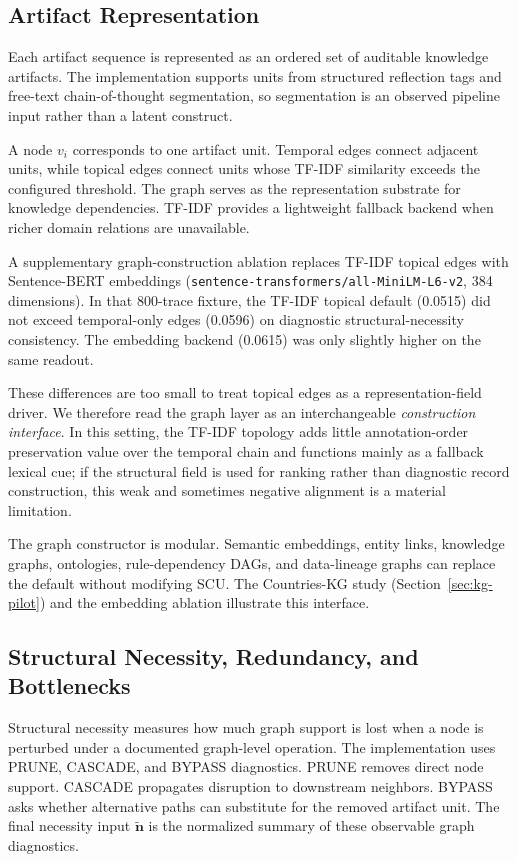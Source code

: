 \documentclass[a4paper,fleqn]{cas-sc}
\begin{document}
\subsection{Artifact Representation}

Each artifact sequence is represented as an ordered set of auditable knowledge artifacts. The implementation supports units from structured reflection tags and free-text chain-of-thought segmentation, so segmentation is an observed pipeline input rather than a latent construct.

A node $v_i$ corresponds to one artifact unit. Temporal edges connect adjacent units, while topical edges connect units whose TF-IDF similarity exceeds the configured threshold. The graph serves as the representation substrate for knowledge dependencies. TF-IDF provides a lightweight fallback backend when richer domain relations are unavailable.

A supplementary graph-construction ablation replaces TF-IDF topical edges with Sentence-BERT embeddings (\texttt{sentence-transformers/all-MiniLM-L6-v2}, 384 dimensions). In that 800-trace fixture, the TF-IDF topical default (0.0515) did not exceed temporal-only edges (0.0596) on diagnostic structural-necessity consistency. The embedding backend (0.0615) was only slightly higher on the same readout.

These differences are too small to treat topical edges as a representation-field driver. We therefore read the graph layer as an interchangeable \emph{construction interface}. In this setting, the TF-IDF topology adds little annotation-order preservation value over the temporal chain and functions mainly as a fallback lexical cue; if the structural field is used for ranking rather than diagnostic record construction, this weak and sometimes negative alignment is a material limitation.

The graph constructor is modular. Semantic embeddings, entity links, knowledge graphs, ontologies, rule-dependency DAGs, and data-lineage graphs can replace the default without modifying SCU. The Countries-KG study (Section~\ref{sec:kg-pilot}) and the embedding ablation illustrate this interface.

\subsection{Structural Necessity, Redundancy, and Bottlenecks}

Structural necessity measures how much graph support is lost when a node is perturbed under a documented graph-level operation. The implementation uses PRUNE, CASCADE, and BYPASS diagnostics. PRUNE removes direct node support. CASCADE propagates disruption to downstream neighbors. BYPASS asks whether alternative paths can substitute for the removed artifact unit. The final necessity input $\tilde{\mathbf{n}}$ is the normalized summary of these observable graph diagnostics.
\end{document}
